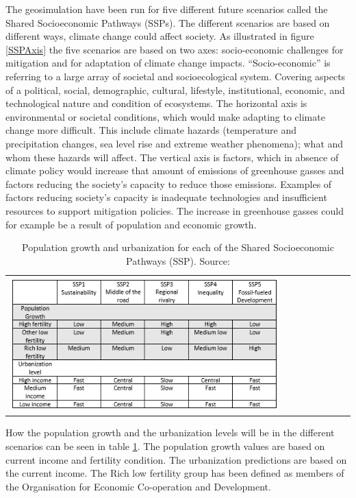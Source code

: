 The geosimulation have been run for five different future scenarios called the Shared Socioeconomic Pathways (SSPs). The different scenarios are based on different ways, climate change could affect society. As illustrated in figure \ref{SSPAxis} the five scenarios are based on two axes: socio-economic challenges for mitigation and for adaptation of climate change impacts. 
“Socio-economic” is referring to a large array of societal and socioecological system. Covering aspects of a political, social, demographic, cultural, lifestyle, institutional, economic, and technological nature and condition of ecosystems. 
The horizontal axis is environmental or societal conditions, which would make adapting to climate change more difficult. This include climate hazards (temperature and precipitation changes, sea level rise and extreme weather phenomena); what and whom these hazards will affect.
\citep{ConceptSSP}
The vertical axis is factors, which in absence of climate policy would increase that amount of emissions of greenhouse gasses and factors reducing the society’s capacity to reduce those emissions. Examples of factors reducing society’s capacity is inadequate technologies and insufficient resources to support mitigation policies. The increase in greenhouse gasses could for example be a result of population and economic growth.
\citep{SSP}

\begin{table}[htbp]
	\centering
	\begin{tabular}{l}
		\includegraphics[width=0.8\textwidth]{Pictures/SSPTable}
	\end{tabular}
	\caption{Population growth and urbanization for each of the Shared Socioeconomic Pathways (SSP). Source: \citet{WhyDetailedPop}}
	\label{SSPTable}
\end{table}

How the population growth and the urbanization levels will be in the different scenarios can be seen in table \ref{SSPTable}. The population growth values are based on current income and fertility condition. The urbanization predictions are based on the current income. The Rich low fertility group has been defined as members of the Organisation for Economic Co-operation and Development.

